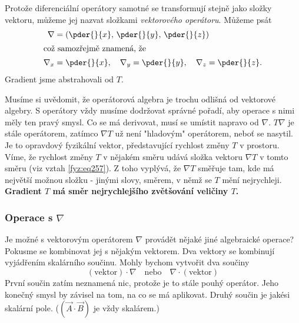       Protože diferenciální operátory samotné se transformují stejně jako složky vektoru, můžeme jej 
      nazvat složkami \emph{vektorového operátoru}. Můžeme psát
      \begin{align}
        \nabla   &= \left(\pder{ }{x},\,\pder{ }{y},\,\pder{ }{z}\right)       \label{fyz:eq258}\\
        \shortintertext{což samozřejmě znamená, že}
        \nabla_x &= \pder{ }{x},\quad \nabla_y=\pder{ }{y},\quad\nabla_z=\pder{ }{z}.
      \end{align}  
      Gradient jsme abstrahovali od \(T\).
  
      Musíme si uvědomit, že operátorová algebra je trochu odlišná od vektorové algebry. S operátory 
      vždy musíme dodržovat správné pořadí, aby operace s nimi měly ten pravý smysl. Co se má 
      derivovat, musí se umístit napravo od $\nabla$. $T\nabla$ je stále operátorem, zatímco $\nabla 
      T$ už není "hladovým" operátorem, neboť se nasytil. Je to opravdový fyzikální vektor, 
      představující rychlost změny $T$ v prostoru. Víme, že rychlost změny $T$ v nějakém směru udává 
      složka vektoru $\nabla T$ v tomto směru (viz vztah \ref{fyz:eq257}). Z toho vyplývá, že 
      $\nabla T$ směřuje tam, kde má největší možnou složku - jinými slovy, směrem, v němž se $T$ 
      mění nejrychleji. \textbf{Gradient $T$ má směr nej\-rychlejšího zvětšo\-vání veličiny $T$.}
      
      \subsubsection{Operace s \texorpdfstring{\(\nabla\)}{nabla}}
        Je možné s vektorovým operátorem $\nabla$ provádět nějaké jiné algebraické operace? Pokusme 
        se kombinovat jej s nějakým vektorem. Dva vektory se kombinují vy\-já\-dře\-ním skalárního 
        součinu. Mohly bychom vytvořit dva součiny
        \begin{equation}\label{fyz:eq259}
          (\mathrm{vektor})\cdot\nabla\quad\mathrm{nebo}\quad\nabla\cdot(\mathrm{vektor})
        \end{equation}
        První součin zatím neznamená nic, protože je to stále pouhý operátor. Jeho konečný smysl by 
        závisel na tom, na co se má aplikovat. Druhý součin je jakési skalární pole. 
        ($(\vec{A}\cdot\vec{B})$ je vždy skalárem.)
  

